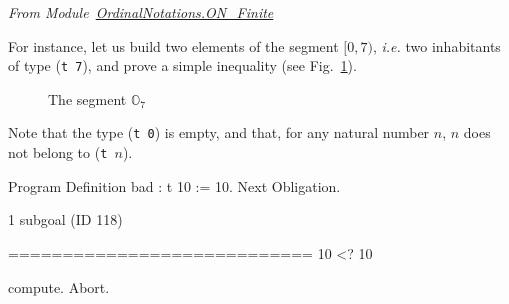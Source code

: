 \vspace{4pt}
\noindent\emph{From Module~\href{../theories/html/hydras.OrdinalNotations.ON_Finite.html}{OrdinalNotations.ON\_Finite}}

\label{def: Finite-ord-type}



For instance, let us build two elements of the segment $[0, 7)$, \emph{i.e.} two
inhabitants of   type (\texttt{t 7}), and prove a simple  inequality (see Fig.~\ref{fig:O7}).

\begin{figure}[h]
\centering
{}

\caption{The segment $\mathbb{O}_7$\label{fig:O7}}
\end{figure}
  






Note that the type (\texttt{t 0}) is empty, and that, for any natural number
 $n$, $n$ does not belong to (\texttt{t $n$}).

 

\begin{Coqsrc}
Program Definition bad : t 10 := 10.
Next Obligation.
\end{Coqsrc}

\begin{Coqanswer}
1 subgoal (ID 118)
  
  ============================
  10 <? 10 
\end{Coqanswer}

\begin{Coqsrc}
  compute.
Abort.
\end{Coqsrc}

%

